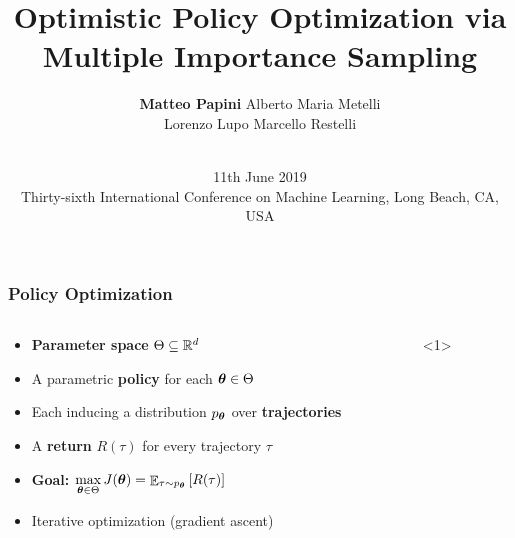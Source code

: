 \documentclass[aspectratio=169, table]{beamer}
\title{Optimistic Policy Optimization via Multiple Importance Sampling}
\date[AAA]{\vspace{0.2cm} \\ \small{ 11th June 2019 \\ Thirty-sixth International Conference on Machine Learning, Long Beach, CA, {USA}}}
\author[M. Papini]{\textbf{Matteo Papini} \quad Alberto Maria Metelli\\
						{Lorenzo Lupo \quad Marcello Restelli}}
\newcommand{\enb}[1]{\textcolor{poliblue1}{\textbf{#1}}}
\begin{document}

\begin{frame}[noframenumbering]
\titlepage
\end{frame}

\begin{frame}
\frametitle{Policy Optimization} 
\begin{columns}
\begin{column}{.65\textwidth}
\begin{overlayarea}{\textwidth}{\textheight}
\begin{itemize}
	\setlength{\itemsep}{20pt}
	\item \enb{Parameter space} $\Theta \subseteq \mathbb{R}^d$
	\item<2-> A parametric \enb{policy} for each $\boldsymbol{\theta}\in\Theta$
	\item<3-> Each inducing a distribution $p_{\boldsymbol{\theta}}$ over \enb{trajectories}
	\item<4-> A \enb{return} $R(\tau)$ for every trajectory $\tau$
	\item<5-> {\enb{Goal:} $\max\limits_{\boldsymbol{\theta}\in\Theta} J(\boldsymbol{\theta}) = \mathop{\mathbb{E}}_{\tau\sim p_{\boldsymbol{\theta}}}\left[R(\tau)\right]$}
	\item<6-> Iterative optimization (\eg gradient ascent)
\end{itemize}
\end{overlayarea}
\end{column}
\begin{column}{.35\textwidth}
\begin{overlayarea}{\textwidth}{\textheight}

\end{overlayarea}
\end{column}
\end{columns}
\end{frame}
\end{document}
